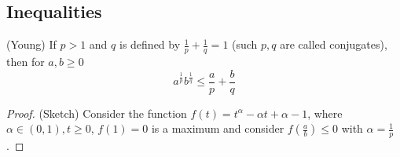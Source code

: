 \documentclass{article}
\begin{document}








\subsection{Inequalities}

\begin{prop}
\label{young}
(Young) If $p>1$ and $q$ is defined by $\frac{1}{p}+\frac{1}{q}=1$ (such $p,q$ are called conjugates), then for $a,b \geq 0$  
\begin{equation}
    a^{\frac{1}{p}}b^{\frac{1}{q}} \leq \frac{a}{p} + \frac{b}{q} 
\end{equation}
\end{prop}  

\begin{proof}
    (Sketch) Consider the function $f(t) = t^{\alpha}-\alpha t+\alpha-1$, where $\alpha \in (0,1), t\geq 0$,
    $f(1)=0$ is a maximum and consider $f(\frac{a}{b})\leq 0$ with $\alpha=\frac{1}{p}$.  
\end{proof}
\end{document}
